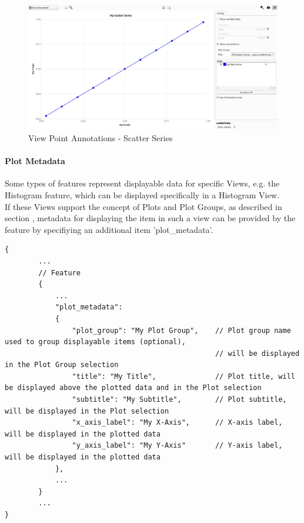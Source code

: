 \begin{figure}[H]
    \center
        \includegraphics[width=15cm]{figures/viewpoints_anno_example_scatter.png}
    \caption{View Point Annotations - Scatter Series} 
\end{figure}

\paragraph{Plot Metadata}

Some types of features represent displayable data for specific Views, e.g. the Histogram feature,
which can be displayed specifically in a Histogram View. \\

If these Views support the concept of Plots and Plot Groups, as described in section ,
metadata for displaying the item in such a view can be provided by the feature by specifiying an additional item 'plot\_metadata'.

\begin{lstlisting}[basicstyle=\small\ttfamily]
{
        ...
        // Feature 
        {
            ...
            "plot_metadata": 
            {
                "plot_group": "My Plot Group",    // Plot group name used to group displayable items (optional), 
                                                  // will be displayed in the Plot Group selection
                "title": "My Title",              // Plot title, will be displayed above the plotted data and in the Plot selection
                "subtitle": "My Subtitle",        // Plot subtitle, will be displayed in the Plot selection
                "x_axis_label": "My X-Axis",      // X-axis label, will be displayed in the plotted data
                "y_axis_label": "My Y-Axis"       // Y-axis label, will be displayed in the plotted data
            },
            ...
        }
        ...
}
\end{lstlisting}


